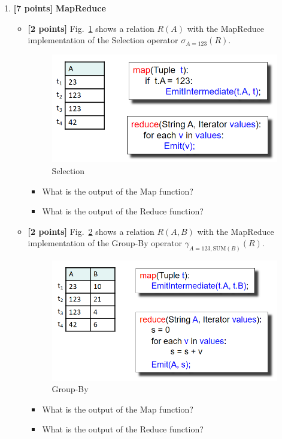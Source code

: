 \documentclass[10pt]{article}
\begin{document}
\begin{enumerate}
	\item \textbf{[7 points]} \textbf{MapReduce} \\
	      \begin{itemize}
		      \item[(a)]  \textbf{[2 points]}  Fig.~\ref{mr1} shows a relation $R(A)$ with the MapReduce implementation of the Selection operator $\sigma_{A=123}(R)$.
		            \begin{figure}[H]
			            \centering
			            \includegraphics[width=0.5\linewidth]{mr_selection}
			            \caption{Selection}
			            \label{mr1}
		            \end{figure}
		            \begin{itemize}
			            \item[(1)] What is the output of the Map function?
			            \item[(2)] What is the output of the Reduce function?
		            \end{itemize}
		      \item[(b)] \textbf{[2 points]}  Fig.~\ref{mr2} shows a relation $R(A,B)$ with the MapReduce implementation of the Group-By operator $\gamma_{A=123,\text{SUM} (B)}(R)$.
		            \begin{figure}[H]
			            \centering
			            \includegraphics[width=0.5\linewidth]{mr_group}
			            \caption{Group-By}
			            \label{mr2}
		            \end{figure}
		            \begin{itemize}
			            \item[(1)] What is the output of the Map function?
			            \item[(2)] What is the output of the Reduce function?
		            \end{itemize}

\end{itemize}
\end{enumerate}
\end{document}
